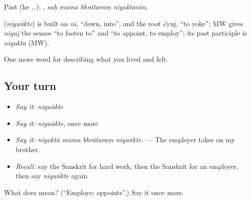 Past (he …):    , \emph{saḥ mama bhrātaraṃ niyuktavān}.

\begin{cousinweb}
\textbf{} (\emph{niyuṅkte}) is built on \emph{ni}, \textquotedblleft{}down, into\textquotedblright{}, and the root √yuj, \textquotedblleft{}to yoke\textquotedblright{}; MW gives \emph{niyuj} the senses \textquotedblleft{}to fasten to\textquotedblright{} and \textquotedblleft{}to appoint, to employ\textquotedblright{}; its past participle is \emph{niyukta} (MW).
\end{cousinweb}

\begin{grammarlens}[title={What you've built}]
One more word for describing what you lived and felt.
\end{grammarlens}

\subsection*{Your turn}
\begin{itemize}
\raggedright
  \item \emph{Say it:} \emph{niyuṅkte}
  \item \emph{Say it:} \emph{niyuṅkte}, once more
  \item \emph{Say it:} \emph{niyoktā mama bhrātaraṃ niyuṅkte.} — The employer takes on my brother.
  \item \emph{Recall:} say the Sanskrit for hard work, then the Sanskrit for an employer, then say \emph{niyuṅkte} again
\end{itemize}

\begin{tcolorbox}[breakable,colback=teal!4,colframe=teal!35!black,title={Before you move on}]
What does  mean? (\textquotedblleft{}Employs; appoints\textquotedblright{}.) Say it once more.
\end{tcolorbox}
